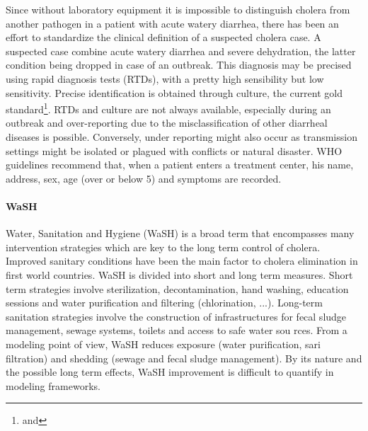 Since without laboratory equipment it is impossible to distinguish cholera from another pathogen in a patient with acute watery diarrhea, there has been an effort to standardize the clinical definition of a suspected cholera case. %
A suspected case combine acute watery diarrhea and severe dehydration, the latter condition being dropped in case of an outbreak. This diagnosis may be precised using rapid diagnosis tests (RTDs), with a pretty high sensibility but low sensitivity. Precise identification is obtained through culture, the current gold standard\footnote{ and }. RTDs and culture are not always available, especially during an outbreak and over-reporting due to the misclassification of other diarrheal diseases is possible. Conversely, under reporting might also occur as transmission settings might be isolated or plagued with conflicts or natural disaster. WHO guidelines recommend that, when a patient enters a treatment center, his name, address, sex, age (over or below 5) and symptoms are recorded\cite{WHO:FirstStepsManaging:2010}. %

\paragraph{WaSH} Water, Sanitation and Hygiene (WaSH) is a broad term that encompasses many intervention strategies which are key to the long term control of cholera. Improved sanitary conditions have been the main factor to cholera elimination in first world countries. WaSH is divided into short and long term measures. Short term strategies involve sterilization, decontamination, hand washing, education sessions and water purification and filtering (chlorination, ...)\cite[-2\baselineskip]{Rebaudet:NationalAlertresponseStrategy:2018,Fewtrell:WaterSanitationHygiene:2005}. Long-term sanitation strategies involve the construction of infrastructures for fecal sludge management, sewage systems, toilets and access to safe water sou rces. From a modeling point of view, WaSH reduces exposure (water purification, sari filtration\cite{Colwell:ReductionCholeraBangladeshi:2003}) and shedding (sewage and fecal sludge management). By its nature and the possible long term effects, WaSH improvement is difficult to quantify in modeling frameworks.

